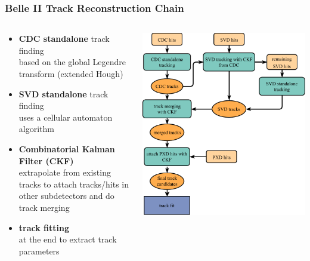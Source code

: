 \documentclass[18pt, aspectratio=169]{beamer}
\newcommand{\kitemph}[1]{\textcolor{kit-green100}{\bf{#1}}}
\begin{document}
\begin{frame}
  \frametitle{Belle II Track Reconstruction Chain}
  \begin{columns}
    \begin{column}{0.53\textwidth}
      \begin{itemize}
      \item \kitemph{CDC standalone} track finding\\
        based on the global Legendre transform (extended Hough)
      \item \kitemph{SVD standalone} track finding\\
        uses a cellular automaton algorithm
      \item \kitemph{Combinatorial Kalman Filter (CKF)}\\
        extrapolate from existing tracks to attach tracks/hits in other subdetectors and
        do track merging
      \item \textbf{\textcolor{kit-blue100}{track fitting}}\\
        at the end to extract track parameters \
      \end{itemize}
    \end{column}
    \begin{column}{0.47\textwidth}
      \centering
      \includegraphics[width=.95\textwidth]{figures/full_track_finding_simplified.pdf}
    \end{column}
  \end{columns}
\end{frame}
\end{document}
